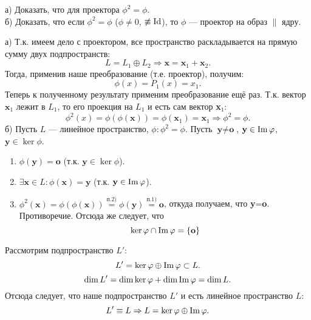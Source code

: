 \begin{prim}
	а) Доказать, что для проектора $\phi^2=\phi$.\\
	б) Доказать, что если $\phi^2=\phi$ ($\phi\neq0$, $\not\equiv\operatorname{\mathop{Id}}$), то $\phi$ --- проектор на образ $\parallel$ ядру.
\end{prim}
а) Т.к. имеем дело с проектором, все пространство раскладывается на прямую сумму двух подпространств:
$$
L=L_1\oplus L_2\Rightarrow \textbf{x}=\textbf{x$_1$}+\textbf{x$_2$}.
$$
Тогда, применив наше преобразование (т.е. проектор), получим:
$$
\phi(x)=P_1(x)=x_1.
$$
Теперь к полученному результату применим преобразование ещё раз. Т.к. вектор $\textbf{x$_1$}$ лежит в $L_1$, то его проекция на $L_1$ и есть сам вектор \textbf{x$_1$}:
$$
\phi^2(x)=\phi(\phi(\textbf{x}))=\phi(\textbf{x$_1$})=\textbf{x$_1$} \Rightarrow \boxed{\phi^2=\phi}.
$$
б) Пусть $L$ --- линейное пространство, $\phi: \phi^2=\phi$. Пусть $\textbf{y}\neq \textbf{o}$, $\textbf{y} \in \operatorname{\mathop{Im}}\varphi$, $\textbf{y}\in\ker\phi$.
\begin{enumerate}
	\item $\phi(\textbf{y}) = \textbf{o}$ (т.к. $\textbf{y}\in\ker\phi$).
	\item $\exists \textbf{x}\in L: \phi(\textbf{x}) = \textbf{y}$ (т.к. $\textbf{y}\in\operatorname{\mathop{Im}}\varphi$).
	\item $\phi^2(\textbf{x})=\phi(\phi(\textbf{x}))\overset{\text{п.2)}}=\phi(\textbf{y})\overset{\text{п.1)}}{=}\textbf{o}$, откуда получаем, что \textbf{y}=\textbf{o}. Противоречие. Отсюда же следует, что
	$$
	\ker\varphi\cap\operatorname{\mathop{Im}}\varphi=\{\textbf{o}\}
	$$
\end{enumerate}
Рассмотрим подпространство $L'$:
$$
L'=\ker\varphi\oplus\operatorname{\mathop{Im}}\varphi\subset L.
$$
$$
\dim L'=\dim\ker\varphi+\dim\operatorname{\mathop{Im}}\varphi=\dim L.
$$
Отсюда следует, что наше подпространство $L'$ и есть линейное пространство $L$:
$$
L'\equiv L \Rightarrow L=\ker\varphi\oplus\operatorname{\mathop{Im}}\varphi.
$$

